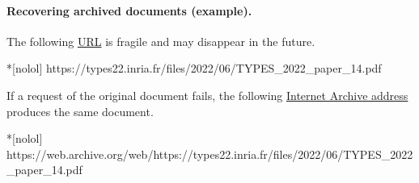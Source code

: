 \paragraph*{Recovering archived documents (example).}\mbox{}

The following \href{https://types22.inria.fr/files/2022/06/TYPES_2022_paper_14.pdf}{URL} is fragile and may disappear in the future.
\begin{center}
\begin{minipage}{\textwidth}
\begin{cmdlisting}*[nolol]
https://types22.inria.fr/files/2022/06/TYPES_2022_paper_14.pdf
\end{cmdlisting}
\end{minipage}
\end{center}

If a request of the original document fails,
the following \href{https://web.archive.org/web/https://types22.inria.fr/files/2022/06/TYPES_2022_paper_14.pdf}
{Internet Archive address} produces the same document.
\begin{center}
\begin{minipage}{\textwidth}
\begin{cmdlisting}*[nolol]
https://web.archive.org/web/https://types22.inria.fr/files/2022/06/TYPES_2022_paper_14.pdf
\end{cmdlisting}
\end{minipage}
\end{center}